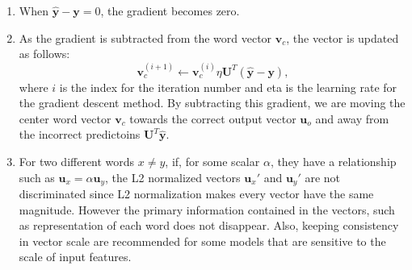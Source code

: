 \documentclass{article}
\begin{document}
\begin{enumerate}[label=(\alph*)]
\begin{enumerate}[label=(\roman*)]
            \item When $\hat{\bm{y}} - \bm{y}=0$, the gradient becomes zero.
            
            \item As the gradient is subtracted from the word vector $\bm{v}_c$, the vector is updated as follows:
            \begin{equation*}
                \bm{v}_c^{(i+1)} \leftarrow \bm{v}_c^{(i)} \eta \bm{U}^T(\hat{\bm{y}} - \bm{y}),
            \end{equation*} where $i$ is the index for the iteration number and eta is the learning rate for the gradient descent method.
            By subtracting this gradient, we are moving the center word vector $\bm{v}_c$ towards the correct output vector $\bm{u}_o$ and away from the incorrect predictoins $\bm{U}^T\hat{\bm{y}}$.
        
            \item For two different words $x\ne y$, if, for some scalar $\alpha$, they have a relationship such as $\bm{u}_x = \alpha \bm{u}_y$,
            the L2 normalized vectors $\bm{u}_x'$ and $\bm{u}_y'$ are not discriminated since L2 normalization makes every vector have the same magnitude.
            However the primary information contained in the vectors, such as representation of each word does not disappear.
            Also, keeping consistency in vector scale are recommended for some models that are sensitive to the scale of input features.
        \end{enumerate}
    

\end{enumerate}
\end{document}
